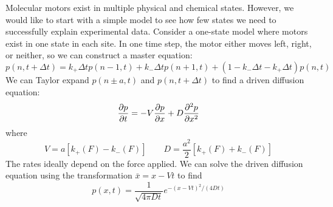 \documentclass[a4paper,twoside,master.tex]{subfiles}
\begin{document}
Molecular motors exist in multiple physical and chemical states. However, we would like to start with a simple model to see how few states we need to successfully explain experimental data. Consider a one-state model where motors exist in one state in each site. In one time step, the motor either moves left, right, or neither, so we can construct a master equation:
\begin{equation}
    p(n, t + \Delta t) = k_+ \Delta t p(n-1, t) + k_- \Delta t p(n+1, t) + (1-k_- \Delta t - k_+ \Delta t) p(n,t)
\end{equation}
We can Taylor expand $ p(n \pm a, t) $ and $ p(n,t + \Delta t) $ to find a driven diffusion equation:
\begin{equation}
    \pdv{p}{t} = - V \pdv{p}{x} + D \pdv[2]{p}{x}
\end{equation}
where
\begin{equation}
    V = a [k_+(F) - k_-(F)] \qquad D = \frac{a^2}{2} \left[ k_+(F) + k_-(F) \right]
\end{equation}
The rates ideally depend on the force applied. We can solve the driven diffusion equation using the transformation $ \bar{x} = x - Vt $ to find
\begin{equation}
    p(x, t) = \frac{1}{\sqrt{4 \pi D t}} e^{-(x - Vt)^2 / (4 D t)}
\end{equation}
\end{document}

